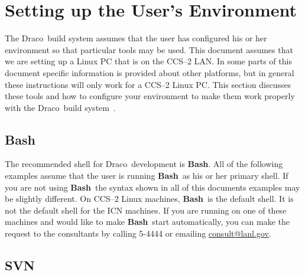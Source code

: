 \documentclass[11pt]{nmemo}
\newcommand{\comp}[1]{\normalfont\footnotesize\texttt{#1}\normalsize}
\newcommand{\draco}{{\normalfont\sffamily Draco}}
\newcommand{\bash}{{\normalfont\bfseries Bash}}
\newenvironment{codeExample} %
{\footnotesize 
  \VerbatimEnvironment
  \begin{SaveVerbatim}{\mycode}}%
  {\end{SaveVerbatim}%
  \noindent%
  \parashade[.950]{sharpcorners}{\gdef\outlineboxwidth{.5}%
    \UseVerbatim{\mycode}}\normalsize}
\begin{document}

\section{Setting up the User's Environment}

The \draco\ build system assumes that the user has configured his or
her environment so that particular tools may be used.  This document
assumes that we are setting up a Linux PC that is on the CCS--2 LAN.
In some parts of this document specific information is provided about
other platforms, but in general these instructions will only work for
a CCS--2 Linux PC.  This section discusses these tools and how to
configure your environment to make them work properly with the
\draco\ build system~\cite{draco-build}.

\subsection{Bash}

The recommended shell for \draco\ development is \bash.  All of the
following examples assume that the user is running \bash\ as his or
her primary shell.  If you are not using \bash\ the syntax shown in
all of this documents examples may be slightly different.  On CCS--2
Linux machines, \bash\ is the default shell.  It is not the default
shell for the ICN machines.  If you are running on one of these
machines and would like to make \bash\ start automatically, you can
make the request to the consultants by calling 5-4444 or emailing
\url{consult@lanl.gov}.




\subsection{SVN}
\end{document}

